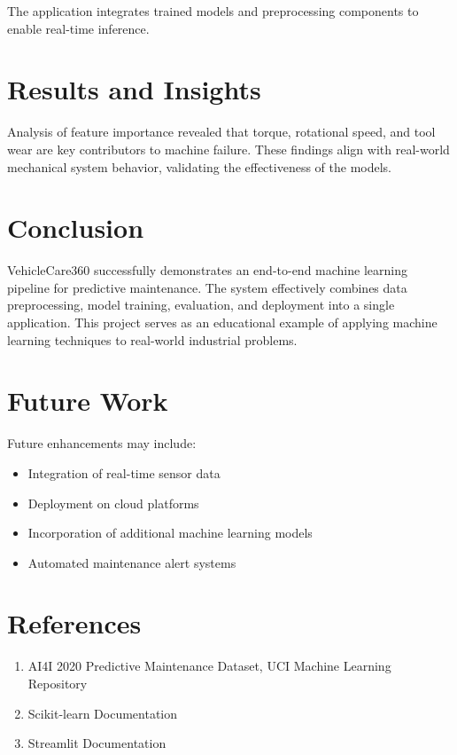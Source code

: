 \documentclass[12pt,a4paper]{article}
\begin{document}
The application integrates trained models and preprocessing components to enable real-time inference.

\section{Results and Insights}
Analysis of feature importance revealed that torque, rotational speed, and tool wear are key contributors to machine failure. These findings align with real-world mechanical system behavior, validating the effectiveness of the models.

\section{Conclusion}
VehicleCare360 successfully demonstrates an end-to-end machine learning pipeline for predictive maintenance. The system effectively combines data preprocessing, model training, evaluation, and deployment into a single application. This project serves as an educational example of applying machine learning techniques to real-world industrial problems.

\section{Future Work}
Future enhancements may include:
\begin{itemize}
    \item Integration of real-time sensor data
    \item Deployment on cloud platforms
    \item Incorporation of additional machine learning models
    \item Automated maintenance alert systems
\end{itemize}

\section*{References}
\begin{enumerate}
    \item AI4I 2020 Predictive Maintenance Dataset, UCI Machine Learning Repository
    \item Scikit-learn Documentation
    \item Streamlit Documentation
\end{enumerate}
\end{document}

